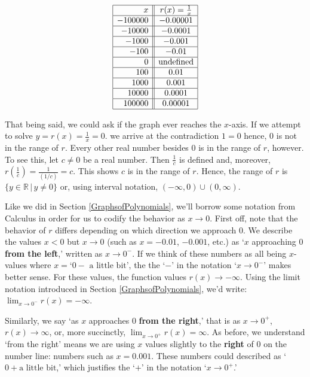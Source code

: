 \documentclass{ximera}
\begin{document}
\[\begin{array}{|r||c|}  \hline
 x & r(x) = \frac{1}{x}  \\ \hline
 -100000 & -0.00001  \\  \hline 
 -10000 &  -0.0001 \\  \hline 
 -1000 & -0.001  \\  \hline 
 -100 & -0.01  \\  \hline
0 & \text{undefined} \\  \hline
 100 & 0.01  \\  \hline
 1000 & 0.001  \\  \hline 
 10000 & 0.0001 \\  \hline
 100000 & 0.00001  \\  \hline  
  \end{array}\]

That being said, we could ask if the graph ever reaches the $x$-axis.  If we attempt to solve $y = r(x) = \frac{1}{x} = 0$. we arrive at the contradiction $1 = 0$ hence, $0$ is not in the range of $r$.  Every other real number besides $0$ is in the range of $r$, however.  To see this, let $c \neq 0$ be a real number.  Then $\frac{1}{c}$ is defined and, moreover, $r \left(\frac{1}{c} \right) = \frac{1}{(1/c)} = c$.  This shows $c$ is in the range of $r$.  Hence, the range of $r$ is $\{ y \in \mathbb{R} \, | \, y \neq 0\}$ or, using interval notation,  $(-\infty, 0) \cup (0, \infty)$.  


Like we did in Section \ref{GraphsofPolynomials}, we'll borrow some notation from Calculus in order for us to codify the behavior as $x \rightarrow 0$.  First off, note that the behavior of $r$ differs depending on which direction we approach $0$.  We describe the values $x<0$ but $x \rightarrow 0$  (such as $x = -0.01$, $-0.001$, etc.)  as  `$x$ approaching $0$ \textbf{from the left},' written as $x \rightarrow 0^{-}$.  If we think of these numbers as all being $x$-values where  $x  = \text{`$0-$ a little bit'}$, the  the `$-$' in the notation `$x \rightarrow 0^{-}$' makes better sense.  For these values,  the function values $r(x) \rightarrow -\infty$.   Using the limit notation introduced in Section \ref{GraphsofPolynomials}, we'd write: $\lim_{x \rightarrow 0^{-}} r(x) = - \infty$.  


Similarly, we say `as $x$ approaches $0$ \textbf{from the right},' that is as $x \rightarrow 0^{+}$, $r(x) \rightarrow \infty$, or, more succinctly, $\lim_{x \rightarrow 0^{+}} r(x) =  \infty$.  As before, we understand `from the right' means we are using $x$ values slightly to the \textbf{right} of $0$ on the number line:  numbers such as $x =0.001.$ These numbers could described as `$0 + \text{a little bit}$,' which justifies the `$+$' in the notation `$x \rightarrow 0^{+}$.'
\end{document}
